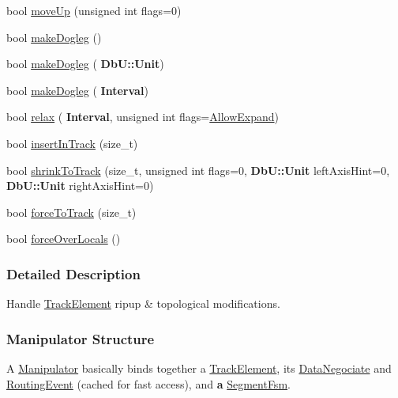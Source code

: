 \begin{DoxyCompactItemize}
\item 
bool \hyperlink{classKite_1_1Manipulator_ac954731e16188acb6984f348bf2d9d20}{move\+Up} (unsigned int flags=0)
\item 
bool \hyperlink{classKite_1_1Manipulator_af4d93a43ea18ae124da71072c66d1e0a}{make\+Dogleg} ()
\item 
bool \hyperlink{classKite_1_1Manipulator_a97e56b831481ef65309f6e3b7e3f4f3d}{make\+Dogleg} (\textbf{ Db\+U\+::\+Unit})
\item 
bool \hyperlink{classKite_1_1Manipulator_af7b3305693dab195d0c5d075821fbb30}{make\+Dogleg} (\textbf{ Interval})
\item 
bool \hyperlink{classKite_1_1Manipulator_a8b5b69fd5762d5a0cbc4ceea4d1b68c1}{relax} (\textbf{ Interval}, unsigned int flags=\hyperlink{classKite_1_1Manipulator_a2af2ad6b6441614038caf59d04b3b217a41880b9f6652400677e21c8681f97675}{Allow\+Expand})
\item 
bool \hyperlink{classKite_1_1Manipulator_a7140b507da2cab137d968a037bed19df}{insert\+In\+Track} (size\+\_\+t)
\item 
bool \hyperlink{classKite_1_1Manipulator_aba69c61ccb330e26aaa8211f0454795f}{shrink\+To\+Track} (size\+\_\+t, unsigned int flags=0, \textbf{ Db\+U\+::\+Unit} left\+Axis\+Hint=0, \textbf{ Db\+U\+::\+Unit} right\+Axis\+Hint=0)
\item 
bool \hyperlink{classKite_1_1Manipulator_a76d3956660cfa624696e2a5f2916cd22}{force\+To\+Track} (size\+\_\+t)
\item 
bool \hyperlink{classKite_1_1Manipulator_add26b688d75a99a1ae781787eead08d5}{force\+Over\+Locals} ()
\end{DoxyCompactItemize}


\subsubsection{Detailed Description}
Handle \hyperlink{classKite_1_1TrackElement}{Track\+Element} ripup \& topological modifications. 

\hypertarget{classKite_1_1Manipulator_secManipStruct}{}\subsubsection{Manipulator Structure}\label{classKite_1_1Manipulator_secManipStruct}
A \hyperlink{classKite_1_1Manipulator}{Manipulator} basically binds together a \hyperlink{classKite_1_1TrackElement}{Track\+Element}, it\textquotesingle{}s \hyperlink{classKite_1_1DataNegociate}{Data\+Negociate} and \hyperlink{classKite_1_1RoutingEvent}{Routing\+Event} (cached for fast access), and {\bfseries a} \hyperlink{classKite_1_1SegmentFsm}{Segment\+Fsm}.

